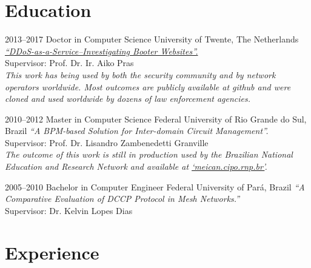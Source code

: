 \documentclass[print]{styles/friggeri-cv-mac} %
\begin{document}
\section{Education}\vspace{-5pt}

\begin{entrylist}

\entry
{2013--2017}
{Doctor {\normalfont in Computer Science}}
{University of Twente, The Netherlands}
{\emph{\href{https://research.utwente.nl/files/18494043/jjsantanna_thesis.pdf}{``DDoS-as-a-Service--Investigating Booter Websites''.}} \\
Supervisor: Prof. Dr. Ir. Aiko Pras\\	
\textit{This work has being used by both the security community and by
network operators worldwide. Most outcomes are publicly available at github and were cloned and used worldwide by dozens of law enforcement agencies.}}

\entry
{2010--2012}
{Master {\normalfont in Computer Science}}
{Federal University of Rio Grande do Sul, Brazil}
{\emph{``A BPM-based Solution for Inter-domain Circuit Management''.}\\
Supervisor: Prof. Dr. Lisandro Zambenedetti Granville\\
\textit{The outcome of this work is still in production used by the Brazilian
National Education and Research Network and available at
\href{http://meican.cipo.rnp.br/}{`meican.cipo.rnp.br'}.}}

\entry
{2005--2010}
{Bachelor {\normalfont in Computer Engineer}}
{Federal University of Par\'a, Brazil}
{\emph{``A Comparative Evaluation of DCCP Protocol in Mesh Networks.''} \\ 
Supervisor: Dr. Kelvin Lopes Dias
}

\end{entrylist}

\section{Experience}\vspace{-5pt}
\end{document}
